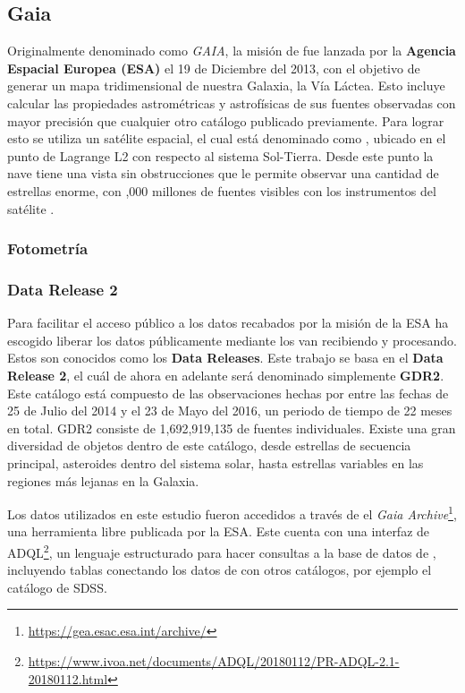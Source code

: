 \subsection{Gaia} \label{muestra:sec:gaia}

Originalmente denominado como \textit{GAIA}, la misión de \gaia fue lanzada por
la \textbf{Agencia Espacial Europea (ESA)} el 19 de Diciembre del 2013, con el
objetivo de generar un mapa tridimensional de nuestra Galaxia, la Vía Láctea.
Esto incluye calcular las propiedades astrométricas y astrofísicas de sus
fuentes observadas con mayor precisión que cualquier otro catálogo publicado
previamente. Para lograr esto se utiliza un satélite espacial, el cual está
denominado como \gaiaNoSpace, ubicado en el punto de Lagrange L2 con respecto al
sistema Sol-Tierra. Desde este punto la nave tiene una vista sin obstrucciones
que le permite observar una cantidad de estrellas enorme, con ,000 millones de fuentes visibles con los instrumentos del satélite
\gaiaNoSpace. \citet*{gaiaMission}

\subsubsection{Fotometría}

\subsubsection{Data Release 2} \label{muestra:sec:gaia:dr2}

Para facilitar el acceso público a los datos recabados por la misión de \gaia la
ESA ha escogido liberar los datos públicamente mediante los van recibiendo y
procesando. Estos son conocidos como los \textbf{Data Releases}. Este trabajo se
basa en el \textbf{Data Release 2}, el cuál de ahora en adelante será denominado
simplemente \textbf{GDR2}. Este catálogo está compuesto de las observaciones
hechas por \gaia entre las fechas de 25 de Julio del 2014 y el 23 de Mayo del
2016, un periodo de tiempo de 22 meses en total. \citet*{gaiaDr2} GDR2 consiste
de 1,692,919,135 de fuentes individuales. Existe una gran diversidad de objetos
dentro de este catálogo, desde estrellas de secuencia principal, asteroides
dentro del sistema solar, hasta estrellas variables en las regiones más lejanas
en la Galaxia.

Los datos utilizados en este estudio fueron accedidos a través de el
\textit{Gaia Archive}\footnote{\url{https://gea.esac.esa.int/archive/}}, una
herramienta libre publicada por la ESA. Este cuenta con una interfaz de
ADQL\footnote{\url{https://www.ivoa.net/documents/ADQL/20180112/PR-ADQL-2.1-20180112.html}},
un lenguaje estructurado para hacer consultas a la base de datos de
\gaiaNoSpace, incluyendo tablas conectando los datos de \gaia con otros
catálogos, por ejemplo el catálogo de SDSS.